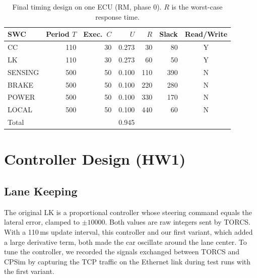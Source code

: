 \documentclass[11pt,a4paper]{article}
\begin{document}
\begin{table}[t]
\centering\small
\caption{Final timing design on one ECU (RM, phase 0). $R$ is the worst-case response time.}
\label{tab:design}
\begin{tabular}{lrrrrrc}
\toprule
SWC & Period $T$ & Exec.\ $C$ & $U$ & $R$ & Slack & Read/Write \\
\midrule
CC      & 110 & 30 & 0.273 &  30 &  80 & Y \\
LK      & 110 & 30 & 0.273 &  60 &  50 & Y \\
SENSING & 500 & 50 & 0.100 & 110 & 390 & N \\
BRAKE   & 500 & 50 & 0.100 & 220 & 280 & N \\
POWER   & 500 & 50 & 0.100 & 330 & 170 & N \\
LOCAL   & 500 & 50 & 0.100 & 440 &  60 & N \\
\midrule
Total   &     &    & 0.945 &     &     &   \\
\bottomrule
\end{tabular}
\end{table}

\section{Controller Design (HW1)}
\subsection{Lane Keeping}
The original LK is a proportional controller whose steering command equals the lateral error,
clamped to $\pm 10000$. Both values are raw integers sent by TORCS. With a 110\,ms update interval,
this controller and our first variant, which added a large derivative term, both made the car
oscillate around the lane center. To tune the controller, we recorded the signals exchanged between
TORCS and CPSim by capturing the TCP traffic on the Ethernet link during test runs with the first
variant.
\end{document}

